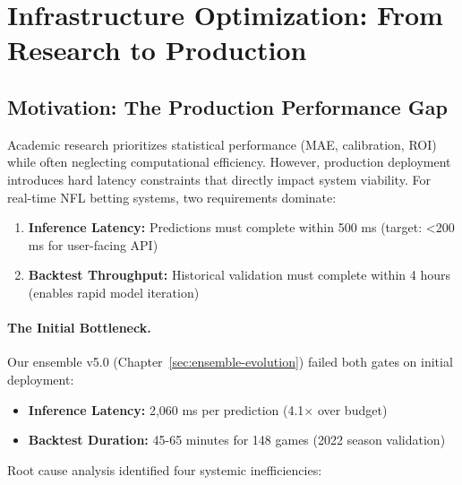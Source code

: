 
\section{Infrastructure Optimization: From Research to Production}
\label{sec:infrastructure-optimization}

\subsection{Motivation: The Production Performance Gap}

Academic research prioritizes statistical performance (MAE, calibration, ROI) while often neglecting computational efficiency. However, production deployment introduces hard latency constraints that directly impact system viability. For real-time NFL betting systems, two requirements dominate:

\begin{enumerate}[itemsep=2pt,parsep=0pt]
    \item \textbf{Inference Latency:} Predictions must complete within 500 ms (target: <200 ms for user-facing API)
    \item \textbf{Backtest Throughput:} Historical validation must complete within 4 hours (enables rapid model iteration)
\end{enumerate}

\paragraph{The Initial Bottleneck.}
Our ensemble v5.0 (Chapter~\ref{sec:ensemble-evolution}) failed both gates on initial deployment:

\begin{itemize}[itemsep=2pt,parsep=0pt]
    \item \textbf{Inference Latency:} 2,060 ms per prediction (4.1$\times$ over budget)
    \item \textbf{Backtest Duration:} 45-65 minutes for 148 games (2022 season validation)
\end{itemize}

Root cause analysis identified four systemic inefficiencies:


